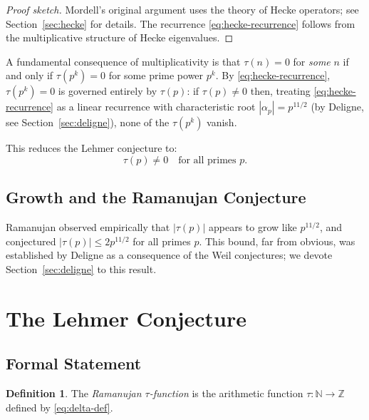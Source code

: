 \documentclass[12pt,a4paper]{amsart}
\theoremstyle{definition}
\newtheorem{definition}[theorem]{Definition}
\begin{document}
\begin{proof}[Proof sketch]
  Mordell's original argument uses the theory of Hecke operators; see
  Section~\ref{sec:hecke} for details. The recurrence \eqref{eq:hecke-recurrence}
  follows from the multiplicative structure of Hecke eigenvalues.
\end{proof}

A fundamental consequence of multiplicativity is that $\tau(n) = 0$ for \emph{some}
$n$ if and only if $\tau(p^k) = 0$ for some prime power $p^k$. By
\eqref{eq:hecke-recurrence}, $\tau(p^k) = 0$ is governed entirely by $\tau(p)$:
if $\tau(p) \neq 0$ then, treating \eqref{eq:hecke-recurrence} as a linear
recurrence with characteristic root $|\alpha_p| = p^{11/2}$ (by Deligne, see
Section~\ref{sec:deligne}), none of the $\tau(p^k)$ vanish.

This reduces the Lehmer conjecture to:
\begin{equation}\label{eq:reduced-conjecture}
  \tau(p) \neq 0 \quad \text{for all primes } p.
\end{equation}

\subsection{Growth and the Ramanujan Conjecture}

Ramanujan observed empirically that $|\tau(p)|$ appears to grow like $p^{11/2}$,
and conjectured $|\tau(p)| \leq 2p^{11/2}$ for all primes $p$. This bound, far
from obvious, was established by Deligne as a consequence of the Weil conjectures;
we devote Section~\ref{sec:deligne} to this result.

\section{The Lehmer Conjecture}

\subsection{Formal Statement}

\begin{definition}
  The \emph{Ramanujan $\tau$-function} is the arithmetic function
  $\tau : \mathbb{N} \to \mathbb{Z}$ defined by \eqref{eq:delta-def}.
\end{definition}
\end{document}
